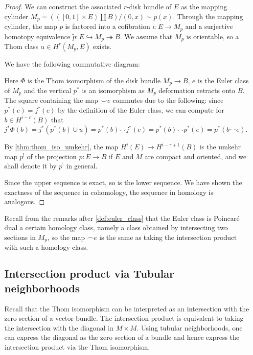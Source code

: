 \documentclass{scrartcl}
\theoremstyle{plain}
\theoremstyle{definition}
\newcommand{\capp}{\mathbin{\frown}}
\newcommand{\cupp}{\mathbin{\smile}}
\newcommand{\iso}{\cong}
\newcommand{\injto}{\hookrightarrow}
\newcommand{\surjto}{\twoheadrightarrow}
\DeclareMathOperator{\id}{id}
\renewcommand{\coprod}{\mathbin{\amalg}}
\begin{document}
\begin{proof}
We can construct the associated $r$-disk bundle of $E$ as the mapping cylinder $M_p = (([0, 1]\times E) \coprod B) / (0, x) \sim p(x)$. Through the mapping cylinder, the map $p$ is factored into a cofibration $\iota\colon E\to M_p$ and a surjective homotopy equivalence $\tilde p\colon E \injto M_p \surjto B$. We assume that $M_p$ is orientable, so a Thom class $u\in H^r(M_p, E)$ exists. 

We have the following commutative diagram: 


Here $\Phi$ is the Thom isomorphism of the disk bundle $M_p\to B$, $e$ is the Euler class of $M_p$ and the vertical $p^*$ is an isomorphism as $M_p$ deformation retracts onto $B$. The square containing the map $\cupp e$ commutes due to the following: since $p^*(e) = j^*(c)$ by the definition of the Euler class, we can compute for $b\in H^{i-r}(B)$ that $j^*\Phi(b) = j^*(p^*(b)\cup u) = p^*(b) \cupp j^*(c) = p^*(b) \cupp p^*(e) = p^*(b\cupp e)$. 

By \cref{thm:thom_iso_umkehr}, the map $H^i(E)\to H^{i-r+1}(B)$ is the umkehr map $p^!$ of the projection $p\colon E\to B$ if $E$ and $M$ are compact and oriented, and we shall denote it by $p^!$ in general.

Since the upper sequence is exact, so is the lower sequence. We have shown the exactness of the sequence in cohomology, the sequence in homology is analogous. 
\end{proof}


Recall from the remarks after \cref{def:euler_class} that the Euler class is Poincaré dual a certain homology class, namely a class obtained by intersecting two sections in $M_p$, so the map $\capp e$ is the same as taking the intersection product with such a homology class. 



\subsection{Intersection product via Tubular neighborhoods} \label{subsec:intersection-via-tubular}
Recall that the Thom isomorphism can be interpreted as an intersection with the zero section of a vector bundle. The intersection product is equivalent to taking the intersection with the diagonal in $M\times M$. Using tubular neighborhoods, one can express the diagonal as the zero section of a bundle and hence express the intersection product via the Thom isomorphism.
\end{document}

